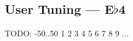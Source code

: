 \subsection{User Tuning --- \UiKey{\I}\UiKey{\SET}E$\flat$4}









































TODO: -50..50
1
2
3
4
5
6
7
8
9
...
